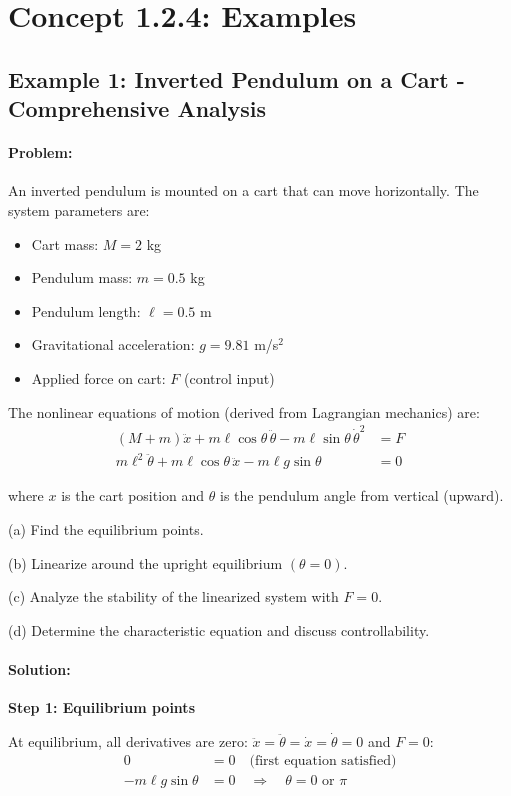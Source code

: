 \documentclass[11pt,a4paper]{article}
\begin{document}
\section{Concept 1.2.4: Examples}

\subsection{Example 1: Inverted Pendulum on a Cart - Comprehensive Analysis}

\paragraph{Problem:} An inverted pendulum is mounted on a cart that can move horizontally. The system parameters are:
\begin{itemize}
\item Cart mass: $M = 2$ kg
\item Pendulum mass: $m = 0.5$ kg
\item Pendulum length: $\ell = 0.5$ m
\item Gravitational acceleration: $g = 9.81$ m/s$^2$
\item Applied force on cart: $F$ (control input)
\end{itemize}

The nonlinear equations of motion (derived from Lagrangian mechanics) are:
\begin{align}
(M + m)\ddot{x} + m\ell\cos\theta\,\ddot{\theta} - m\ell\sin\theta\,\dot{\theta}^2 &= F \\
m\ell^2\ddot{\theta} + m\ell\cos\theta\,\ddot{x} - m\ell g\sin\theta &= 0
\end{align}

where $x$ is the cart position and $\theta$ is the pendulum angle from vertical (upward).

(a) Find the equilibrium points.

(b) Linearize around the upright equilibrium $(\theta = 0)$.

(c) Analyze the stability of the linearized system with $F = 0$.

(d) Determine the characteristic equation and discuss controllability.

\paragraph{Solution:}

\textbf{Step 1: Equilibrium points}

At equilibrium, all derivatives are zero: $\ddot{x} = \ddot{\theta} = \dot{x} = \dot{\theta} = 0$ and $F = 0$:
\begin{align}
0 &= 0 \quad \text{(first equation satisfied)} \\
-m\ell g\sin\theta &= 0 \quad \Rightarrow \quad \theta = 0 \text{ or } \pi
\end{align}
\end{document}
